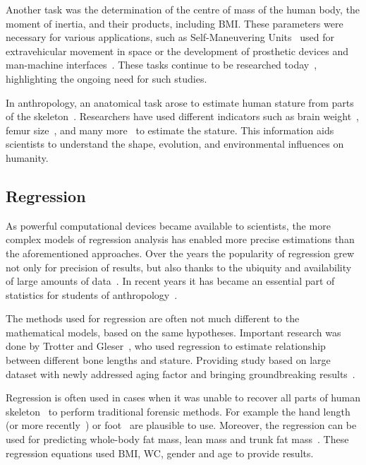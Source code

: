 Another task was the determination of the centre of mass of the human body, the moment of inertia, and their products, including BMI. These parameters were necessary for various applications, such as Self-Maneuvering Units~\cite{bodyInertia} used for extravehicular movement in space or the development of prosthetic devices and man-machine interfaces~\cite{bodyInertia2}. These tasks continue to be researched today~\cite{bodyMotion}, highlighting the ongoing need for such studies.

In anthropology, an anatomical task arose to estimate human stature from parts of the skeleton~\cite{skeletonHeight}. Researchers have used different indicators such as brain weight~\cite{brainStature}, femur size~\cite{femurStature}, and many more~\cite{statureHistory} to estimate the stature. This information aids scientists to understand the shape, evolution, and environmental influences on humanity.
\subsection{Regression}
As powerful computational devices became available to scientists, the more complex models of regression analysis has enabled more precise estimations than the aforementioned approaches. Over the years the popularity of regression grew not only for precision of results, but also thanks to the ubiquity and availability  of large amounts of data~\cite{regressionStature}. In recent years it has became an essential part of statistics for students of anthropology~\cite{regressionStudents}.

The methods used for regression are often not much different to the mathematical models, based on the same hypotheses. 
Important research was done by Trotter and Gleser~\cite{regressionBig}, who used regression to estimate relationship between different bone lengths and stature. Providing study based on large dataset with newly addressed aging factor and bringing groundbreaking results~\cite{statureComparisons}.

Regression is often used in cases when it was unable to recover all parts of human skeleton~\cite{regressionBulk} to perform traditional forensic methods. For example the hand length~\cite{regressionHandFoot, regressionHand} (or more recently~\cite{handNew, handNew2}) or foot~\cite{regressionHandFoot,regressionFoot} are plausible to use. Moreover, the regression can be used for predicting whole-body fat mass, lean mass and trunk fat mass~\cite{regressionBodyFat}. These regression equations used BMI, WC, gender and age to provide results. 

